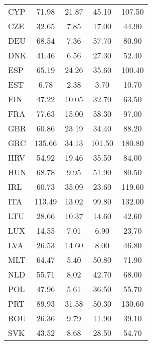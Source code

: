 \begin{table}[hb!]
\begin{threeparttable}
{\begin{tabular}{l*{1}{cccc}}
CYP                 &       71.98&       21.87&       45.10&      107.50\\
CZE                 &       32.65&        7.85&       17.00&       44.90\\
DEU                 &       68.54&        7.36&       57.70&       80.90\\
DNK                 &       41.46&        6.56&       27.30&       52.40\\
ESP                 &       65.19&       24.26&       35.60&      100.40\\
EST                 &        6.78&        2.38&        3.70&       10.70\\
FIN                 &       47.22&       10.05&       32.70&       63.50\\
FRA                 &       77.63&       15.00&       58.30&       97.00\\
GBR                 &       60.86&       23.19&       34.40&       88.20\\
GRC                 &      135.66&       34.13&      101.50&      180.80\\
HRV                 &       54.92&       19.46&       35.50&       84.00\\
HUN                 &       68.78&        9.95&       51.90&       80.50\\
IRL                 &       60.73&       35.09&       23.60&      119.60\\
ITA                 &      113.49&       13.02&       99.80&      132.00\\
LTU                 &       28.66&       10.37&       14.60&       42.60\\
LUX                 &       14.55&        7.01&        6.90&       23.70\\
LVA                 &       26.53&       14.60&        8.00&       46.80\\
MLT                 &       64.47&        5.40&       50.80&       71.90\\
NLD                 &       55.71&        8.02&       42.70&       68.00\\
POL                 &       47.96&        5.61&       36.50&       55.70\\
PRT                 &       89.93&       31.58&       50.30&      130.60\\
ROU                 &       26.36&        9.79&       11.90&       39.10\\
SVK                 &       43.52&        8.68&       28.50&       54.70\\

\end{tabular}}
\end{threeparttable}
\end{table}
